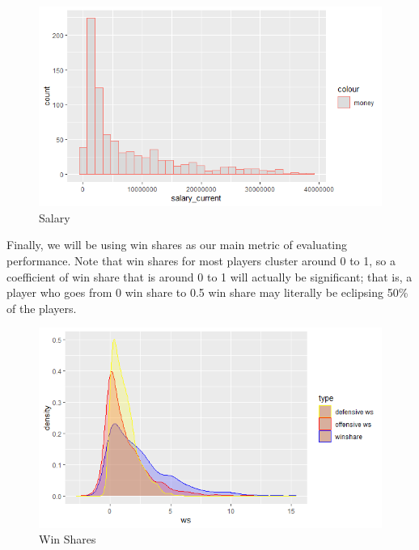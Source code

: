 \documentclass[12pt]{article}
\begin{document}
	\begin{figure}[H]
		\centering
		\includegraphics[width=\textwidth]{money.png}
		\caption{Salary}
		\label{fig:Salary}
	\end{figure}
	
	Finally, we will be using win shares as our main metric of evaluating performance. Note that win shares for most players cluster around 0 to 1, so a coefficient of win share that is around 0 to 1 will actually be significant; that is, a player who goes from 0 win share to 0.5 win share may literally be eclipsing 50\% of the players.	
	
	\begin{figure}[H]
		\centering
		\includegraphics[width=\textwidth]{ws.png}
		\caption{Win Shares}
		\label{fig:Win Shares}
	\end{figure}	
	
\end{document}
